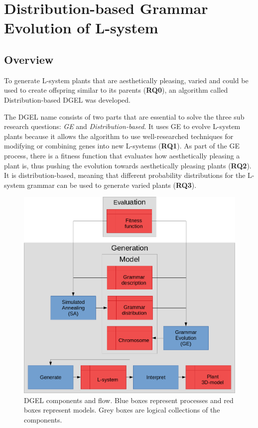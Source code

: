 \chapter{Distribution-based Grammar Evolution of L-system}

\section{Overview}
\label{sec:overview}
To generate \gls{L-system} plants that are aesthetically pleasing, varied and could be used to create offspring similar to its parents (\textbf{RQ0}), an algorithm called Distribution-based \gls{DGEL} was developed.

The \gls{DGEL} name consists of two parts that are essential to solve the three sub research questions: \textit{\gls{GE}} and \textit{Distribution-based}.
It uses \gls{GE} to evolve \gls{L-system} plants because it allows the algorithm to use well-researched techniques for modifying or combining genes into new \glspl{L-system} (\textbf{RQ1}).
As part of the \gls{GE} process, there is a fitness function that evaluates how aesthetically pleasing a plant is, thus pushing the evolution towards aesthetically pleasing plants (\textbf{RQ2}).
It is distribution-based, meaning that different probability distributions for the \gls{L-system} grammar can be used to generate varied plants (\textbf{RQ3}).

\begin{figure}
    \centering
    \includegraphics[width=1.0\textwidth]{figures/dgel}
    \caption[DGEL components and flow]{\gls{DGEL} components and flow. Blue boxes represent processes and red boxes represent models. Grey boxes are logical collections of the components.}
    \label{fig:dgel}
\end{figure}

